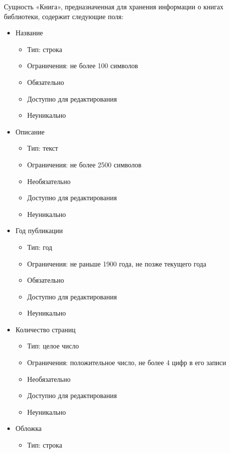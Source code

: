 \documentclass[data-specification.tex]{subfiles}
\begin{document}
\par
Сущность «Книга», предназначенная для хранения информации о книгах библиотеки, содержит следующие поля:
\begin{itemize}
    \item Название
    \begin{itemize}
        \item Тип: строка
        \item Ограничения: не более 100 символов
        \item Обязательно
        \item Доступно для редактирования
        \item Неуникально
    \end{itemize}
    \item Описание
    \begin{itemize}
        \item Тип: текст
        \item Ограничения: не более 2500 символов
        \item Необязательно
        \item Доступно для редактирования
        \item Неуникально
    \end{itemize}
    \item Год публикации
    \begin{itemize}
        \item Тип: год
        \item Ограничения: не раньше 1900 года, не позже текущего года
        \item Обязательно
        \item Доступно для редактирования
        \item Неуникально
    \end{itemize}
    \item Количество страниц
    \begin{itemize}
        \item Тип: целое число
        \item Ограничения: положительное число, не более 4 цифр в его записи
        \item Необязательно
        \item Доступно для редактирования
        \item Неуникально
    \end{itemize}
    \item Обложка
    \begin{itemize}
        \item Тип: строка

\end{itemize}
\end{itemize}
\end{document}
